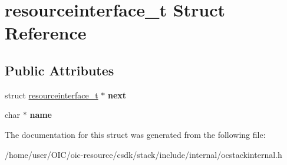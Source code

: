 \hypertarget{structresourceinterface__t}{}\section{resourceinterface\+\_\+t Struct Reference}
\label{structresourceinterface__t}
\subsection*{Public Attributes}
\begin{DoxyCompactItemize}
\item 
\hypertarget{structresourceinterface__t_a15adbb084a0e54bf5ea8f9a0e8527a92}{}struct \hyperlink{structresourceinterface__t}{resourceinterface\+\_\+t} $\ast$ {\bfseries next}\label{structresourceinterface__t_a15adbb084a0e54bf5ea8f9a0e8527a92}

\item 
\hypertarget{structresourceinterface__t_a8965cf3c27e62acf2927194ba99d6147}{}char $\ast$ {\bfseries name}\label{structresourceinterface__t_a8965cf3c27e62acf2927194ba99d6147}

\end{DoxyCompactItemize}


The documentation for this struct was generated from the following file\+:\begin{DoxyCompactItemize}
\item 
/home/user/\+O\+I\+C/oic-\/resource/csdk/stack/include/internal/ocstackinternal.\+h\end{DoxyCompactItemize}
